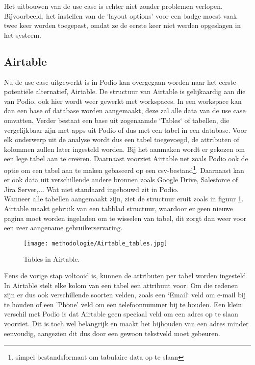 Het uitbouwen van de use case is echter niet zonder problemen verlopen. Bijvoorbeeld, het instellen van de 'layout options' voor een badge moest vaak twee keer worden toegepast, omdat ze de eerste keer niet werden opgeslagen in het systeem. \\

\newpage



\subsection{Airtable} %

Nu de use case uitgewerkt is in Podio kan overgegaan worden naar het eerste potentiële alternatief, Airtable. De structuur van Airtable is gelijkaardig aan die van Podio, ook hier wordt weer gewerkt met workspaces. In een workspace kan dan een base of database worden aangemaakt, deze zal alle data van de use case omvatten. Verder bestaat een base uit zogenaamde `Tables` of tabellen, die vergelijkbaar zijn met apps uit Podio of dus met een tabel in een database. Voor elk onderwerp uit de analyse wordt dus een tabel toegevoegd, de attributen of kolommen zullen later ingesteld worden. Bij het aanmaken wordt er gekozen om een lege tabel aan te creëren. Daarnaast voorziet Airtable net zoals Podio ook de optie om een tabel aan te maken gebaseerd op een csv-bestand\footnote{simpel bestandsformaat om tabulaire data op te slaan}. Daarnaast kan er ook data uit verschillende andere bronnen zoals Google Drive, Salesforce of Jira Server,$\ldots$ Wat niet standaard ingebouwd zit in Podio. \\

Wanneer alle tabellen aangemaakt zijn, ziet de structuur eruit zoals in figuur \ref{fig:meth_airtable_tables}. Airtable maakt gebruik van een tabblad structuur, waardoor er geen nieuwe pagina moet worden ingeladen om te wisselen van tabel, dit zorgt dan weer voor een zeer aangename gebruikerservaring. \\

\begin{figure}[h]
    \centering
    \texttt{[image: methodologie/Airtable\_tables.jpg]}
    \caption{Tables in Airtable.}
    \label{fig:meth_airtable_tables}
\end{figure}

Eens de vorige stap voltooid is, kunnen de attributen per tabel worden ingesteld. In Airtable stelt elke kolom van een tabel een attribuut voor. Om die redenen zijn er dus ook verschillende soorten velden, zoals een `Email` veld om e-mail bij te houden of een 'Phone' veld om een telefoonnummer bij te houden. Een klein verschil met Podio is dat Airtable geen speciaal veld om een adres op te slaan voorziet. Dit is toch wel belangrijk en maakt het bijhouden van een adres minder eenvoudig, aangezien dit dus door een gewoon tekstveld moet gebeuren. \\

